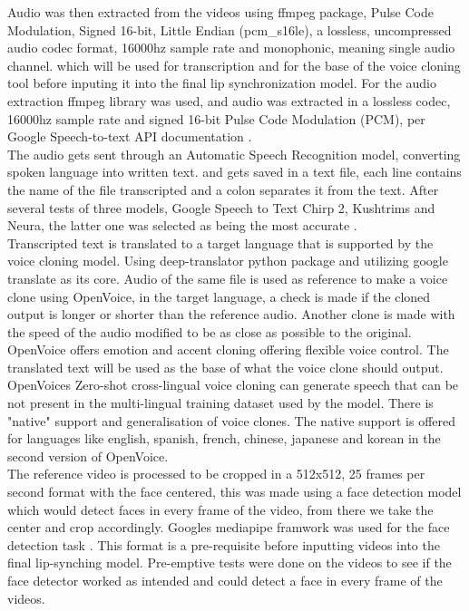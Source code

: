\documentclass[12pt]{article}
\begin{document}
Audio was then extracted from the videos using ffmpeg package, Pulse Code Modulation, Signed 16-bit, Little Endian (pcm\_s16le), a lossless, uncompressed audio codec format, 16000hz sample rate and monophonic, meaning single audio channel.  which will be used for transcription and for the base of the voice cloning tool before inputing it into the final lip synchronization model. For the audio extraction ffmpeg library was used, and audio was extracted in a lossless codec, 16000hz sample rate and signed 16-bit Pulse Code Modulation (PCM), per Google Speech-to-text API documentation \cite{google_api_docs}.\\
The audio gets sent through an Automatic Speech Recognition model, converting spoken language into written text. and gets saved in a text file, each line contains the name of the file transcripted and a colon separates it from the text. After several tests of three models, Google Speech to Text Chirp 2, Kushtrims and Neura, the latter one was selected as being the most accurate \cite{google_api_docs}\cite{kushtrim}\cite{neura}.\\
Transcripted text is translated to a target language that is supported by the voice cloning model. Using deep-translator python package and utilizing google translate as its core. Audio of the same file is used as reference to make a voice clone using OpenVoice, in the target language, a check is made if the cloned output is longer or shorter than the reference audio\cite{openvoice}. Another clone is made with the speed of the audio modified to be as close as possible to the original. OpenVoice offers emotion and accent cloning offering flexible voice control. The translated text will be used as the base of what the voice clone should output. OpenVoices Zero-shot cross-lingual voice cloning can generate speech that can be not present in the multi-lingual training dataset used by the model. There is "native" support and generalisation of voice clones. The native support is offered for languages like english, spanish, french, chinese, japanese and korean in the second version of OpenVoice.\\
The reference video is processed to be cropped in a 512x512, 25 frames per second format with the face centered, this was made using a face detection model which would detect faces in every frame of the video, from there we take the center and crop accordingly. Googles mediapipe framwork was used for the face detection task \cite{GoogleFaceDetector}. This format is a pre-requisite before inputting videos into the final lip-synching model.  Pre-emptive tests were done on the videos to see if the face detector worked as intended and could detect a face in every frame of the videos. 
\end{document}
